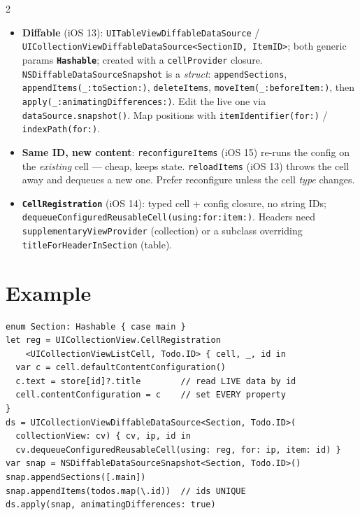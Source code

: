 \documentclass[8pt]{extarticle}
\begin{document}
\begin{multicols}{2}
\begin{itemize}
        object: \texttt{UICollectionViewFlowLayout} or \texttt{UICollectionViewCompositionalLayout}
        (item $\to$ group $\to$ section); lists via \texttt{UICollectionLayoutListConfiguration} (iOS 14).
  \item \textbf{Diffable} (iOS 13): \texttt{UITableViewDiffableDataSource} /
        \texttt{UICollectionViewDiffableDataSource<SectionID, ItemID>}; both generic params
        \textbf{\texttt{Hashable}}; created with a \texttt{cellProvider} closure.
        \texttt{NSDiffableDataSourceSnapshot} is a \emph{struct}: \texttt{appendSections},
        \texttt{appendItems(\_:toSection:)}, \texttt{deleteItems}, \texttt{moveItem(\_:beforeItem:)},
        then \texttt{apply(\_:animatingDifferences:)}. Edit the live one via
        \texttt{dataSource.snapshot()}. Map positions with \texttt{itemIdentifier(for:)} /
        \texttt{indexPath(for:)}.
  \item \textbf{Same ID, new content}: \texttt{reconfigureItems} (iOS 15) re-runs the config on the
        \emph{existing} cell — cheap, keeps state. \texttt{reloadItems} (iOS 13) throws the cell away
        and dequeues a new one. Prefer reconfigure unless the cell \emph{type} changes.
  \item \textbf{\texttt{CellRegistration}} (iOS 14): typed cell + config closure, no string IDs;
        \texttt{dequeueConfiguredReusableCell(using:for:item:)}. Headers need
        \texttt{supplementaryViewProvider} (collection) or a subclass overriding
        \texttt{titleForHeaderInSection} (table).
\end{itemize}

\section{Example}
\begin{lstlisting}[language=SwiftSheet]
enum Section: Hashable { case main }
let reg = UICollectionView.CellRegistration
    <UICollectionViewListCell, Todo.ID> { cell, _, id in
  var c = cell.defaultContentConfiguration()
  c.text = store[id]?.title        // read LIVE data by id
  cell.contentConfiguration = c    // set EVERY property
}
ds = UICollectionViewDiffableDataSource<Section, Todo.ID>(
  collectionView: cv) { cv, ip, id in
  cv.dequeueConfiguredReusableCell(using: reg, for: ip, item: id) }
var snap = NSDiffableDataSourceSnapshot<Section, Todo.ID>()
snap.appendSections([.main])
snap.appendItems(todos.map(\.id))  // ids UNIQUE
ds.apply(snap, animatingDifferences: true)
\end{lstlisting}


\end{multicols}
\end{document}
